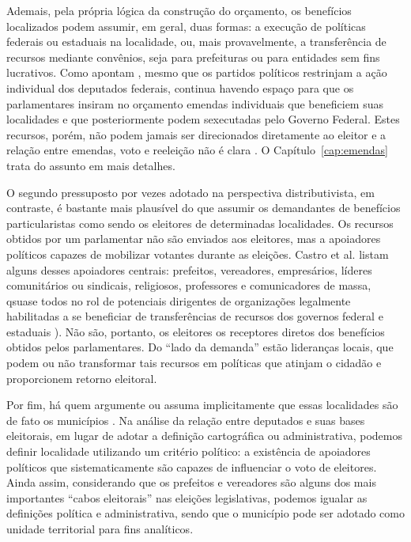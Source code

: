 Ademais, pela própria lógica da construção do orçamento, os  benefícios localizados podem assumir, em geral, duas formas: a execução de políticas federais ou estaduais na localidade, ou, mais provavelmente, a transferência de recursos mediante convênios, seja para prefeituras ou para entidades sem fins lucrativos. Como apontam \citeauthor{Pereira2003}, mesmo que os partidos políticos restrinjam a ação individual dos deputados federais, continua havendo espaço para que os parlamentares insiram no orçamento emendas individuais que beneficiem suas localidades e que posteriormente podem sexecutadas pelo Governo Federal\citep{Pereira2003}. Estes recursos, porém, não podem jamais ser direcionados diretamente ao eleitor e a relação entre emendas, voto e reeleição não é clara \citep{Mesquita2008}. O Capítulo~\ref{cap:emendas} trata do assunto em mais detalhes.

O segundo pressuposto por vezes adotado na perspectiva distributivista, em contraste, é bastante mais plausível do que assumir os demandantes de benefícios particularistas como sendo os eleitores de determinadas localidades. Os recursos obtidos por um parlamentar não são enviados aos eleitores, mas a apoiadores políticos capazes de mobilizar votantes durante as eleições. Castro et al. listam alguns desses apoiadores centrais: prefeitos, vereadores, empresários, líderes comunitários ou sindicais, religiosos, professores e comunicadores de massa, qsuase todos no rol de potenciais dirigentes de organizações legalmente habilitadas a se beneficiar de transferências de recursos dos governos federal e estaduais \citep{Castro2009}). Não são, portanto, os eleitores os receptores diretos dos benefícios obtidos pelos parlamentares. Do ``lado da demanda'' estão lideranças locais, que podem ou não transformar tais recursos em políticas que atinjam o cidadão e proporcionem retorno eleitoral.

Por fim, há quem argumente ou assuma implicitamente que essas localidades são de fato os municípios \citep{Carvalho2003, Pereira2001, Pereira2007}. Na análise da relação entre deputados e suas bases eleitorais, em lugar de adotar a definição cartográfica ou administrativa, podemos definir localidade utilizando um critério político: a existência de apoiadores políticos que sistematicamente são capazes de influenciar o voto de eleitores. Ainda assim, considerando que os prefeitos e vereadores são alguns dos mais importantes ``cabos eleitorais'' nas eleições legislativas, podemos igualar as definições política e administrativa, sendo que o município pode ser adotado como unidade territorial para fins analíticos.

